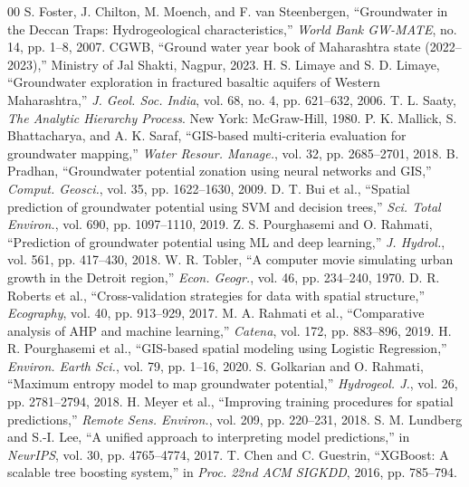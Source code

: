 \documentclass[conference]{IEEEtran}
\begin{document}
\begin{thebibliography}{00}
 S. Foster, J. Chilton, M. Moench, and F. van Steenbergen, ``Groundwater in the Deccan Traps: Hydrogeological characteristics,'' \textit{World Bank GW-MATE}, no. 14, pp. 1--8, 2007.
 CGWB, ``Ground water year book of Maharashtra state (2022--2023),'' Ministry of Jal Shakti, Nagpur, 2023.
 H. S. Limaye and S. D. Limaye, ``Groundwater exploration in fractured basaltic aquifers of Western Maharashtra,'' \textit{J. Geol. Soc. India}, vol. 68, no. 4, pp. 621--632, 2006.
 T. L. Saaty, \textit{The Analytic Hierarchy Process}. New York: McGraw-Hill, 1980.
 P. K. Mallick, S. Bhattacharya, and A. K. Saraf, ``GIS-based multi-criteria evaluation for groundwater mapping,'' \textit{Water Resour. Manage.}, vol. 32, pp. 2685--2701, 2018.
 B. Pradhan, ``Groundwater potential zonation using neural networks and GIS,'' \textit{Comput. Geosci.}, vol. 35, pp. 1622--1630, 2009.
 D. T. Bui et al., ``Spatial prediction of groundwater potential using SVM and decision trees,'' \textit{Sci. Total Environ.}, vol. 690, pp. 1097--1110, 2019.
 Z. S. Pourghasemi and O. Rahmati, ``Prediction of groundwater potential using ML and deep learning,'' \textit{J. Hydrol.}, vol. 561, pp. 417--430, 2018.
 W. R. Tobler, ``A computer movie simulating urban growth in the Detroit region,'' \textit{Econ. Geogr.}, vol. 46, pp. 234--240, 1970.
 D. R. Roberts et al., ``Cross-validation strategies for data with spatial structure,'' \textit{Ecography}, vol. 40, pp. 913--929, 2017.
 M. A. Rahmati et al., ``Comparative analysis of AHP and machine learning,'' \textit{Catena}, vol. 172, pp. 883--896, 2019.
 H. R. Pourghasemi et al., ``GIS-based spatial modeling using Logistic Regression,'' \textit{Environ. Earth Sci.}, vol. 79, pp. 1--16, 2020.
 S. Golkarian and O. Rahmati, ``Maximum entropy model to map groundwater potential,'' \textit{Hydrogeol. J.}, vol. 26, pp. 2781--2794, 2018.
 H. Meyer et al., ``Improving training procedures for spatial predictions,'' \textit{Remote Sens. Environ.}, vol. 209, pp. 220--231, 2018.
 S. M. Lundberg and S.-I. Lee, ``A unified approach to interpreting model predictions,'' in \textit{NeurIPS}, vol. 30, pp. 4765--4774, 2017.
 T. Chen and C. Guestrin, ``XGBoost: A scalable tree boosting system,'' in \textit{Proc. 22nd ACM SIGKDD}, 2016, pp. 785--794.
\end{thebibliography}
\end{document}
